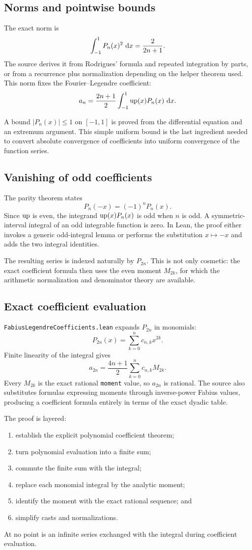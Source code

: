 \documentclass[11pt,oneside]{article}
\theoremstyle{definition}
\theoremstyle{remark}
\begin{document}
\subsection{Norms and pointwise bounds}
The exact norm is
\[
  \int_{-1}^{1}P_n(x)^2\,\mathop{}\!\mathrm{d} x=\frac{2}{2n+1}.
\]
The source derives it from Rodrigues' formula and repeated integration by parts, or from a recurrence plus normalization depending on the helper theorem used.  This norm fixes the Fourier--Legendre coefficient:
\[
  a_n=\frac{2n+1}{2}
      \int_{-1}^{1}\operatorname{up}(x)P_n(x)\,\mathop{}\!\mathrm{d} x.
\]

A bound \(|P_n(x)|\leq1\) on \([-1,1]\) is proved from the differential equation and an extremum argument.  This simple uniform bound is the last ingredient needed to convert absolute convergence of coefficients into uniform convergence of the function series.

\subsection{Vanishing of odd coefficients}
The parity theorem states
\[
  P_n(-x)=(-1)^nP_n(x).
\]
Since \(\operatorname{up}\) is even, the integrand \(\operatorname{up}(x)P_n(x)\) is odd when \(n\) is odd.  A symmetric-interval integral of an odd integrable function is zero.  In Lean, the proof either invokes a generic odd-integral lemma or performs the substitution \(x\mapsto-x\) and adds the two integral identities.

The resulting series is indexed naturally by \(P_{2n}\).  This is not only cosmetic: the exact coefficient formula then uses the even moment \(M_{2k}\), for which the arithmetic normalization and denominator theory are available.

\subsection{Exact coefficient evaluation}
\nolinkurl{FabiusLegendreCoefficients.lean} expands \(P_{2n}\) in monomials:
\[
  P_{2n}(x)=\sum_{k=0}^{n}c_{n,k}x^{2k}.
\]
Finite linearity of the integral gives
\[
  a_{2n}=\frac{4n+1}{2}
          \sum_{k=0}^{n}c_{n,k}M_{2k}.
\]
Every \(M_{2k}\) is the exact rational \nolinkurl{moment} value, so \(a_{2n}\) is rational.  The source also substitutes formulas expressing moments through inverse-power Fabius values, producing a coefficient formula entirely in terms of the exact dyadic table.

The proof is layered:
\begin{enumerate}
  \item establish the explicit polynomial coefficient theorem;
  \item turn polynomial evaluation into a finite sum;
  \item commute the finite sum with the integral;
  \item replace each monomial integral by the analytic moment;
  \item identify the moment with the exact rational sequence; and
  \item simplify casts and normalizations.
\end{enumerate}
At no point is an infinite series exchanged with the integral during coefficient evaluation.
\end{document}
